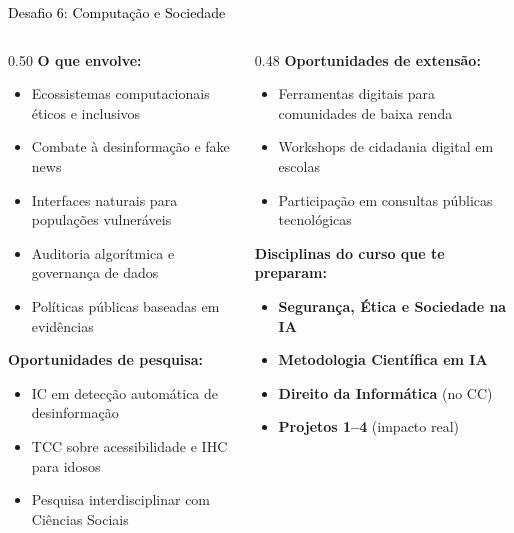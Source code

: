 \documentclass[aspectratio=169]{beamer}
\newcommand{\impt}[1]{\textcolor{morange}{\textbf{#1}}}
\newcommand{\ntc}[1]{\textcolor{mblue}{#1}}
\newcommand{\cc}[1]{\textcolor{mcc}{\textbf{#1}}}
\newcommand{\ia}[1]{\textcolor{mia}{\textbf{#1}}}
\begin{document}
\begin{frame}{\colorbox{dsfsoc}{\textcolor{black}{Desafio 6: Computação e Sociedade}}}
  \footnotesize
  \begin{columns}[T]
    \begin{column}{0.50\textwidth}
      \textbf{O que envolve:}
      \begin{itemize}\setlength\itemsep{3pt}
        \item Ecossistemas computacionais éticos e inclusivos
        \item Combate à desinformação e fake news
        \item Interfaces naturais para populações vulneráveis
        \item Auditoria algorítmica e governança de dados
        \item Políticas públicas baseadas em evidências
      \end{itemize}
      \vspace{0.2cm}
      \textbf{Oportunidades de \impt{pesquisa}:}
      \begin{itemize}\setlength\itemsep{2pt}
        \item IC em detecção automática de desinformação
        \item TCC sobre acessibilidade e IHC para idosos
        \item Pesquisa interdisciplinar com Ciências Sociais
      \end{itemize}
    \end{column}
    \begin{column}{0.48\textwidth}
      \textbf{Oportunidades de \ntc{extensão}:}
      \begin{itemize}\setlength\itemsep{2pt}
        \item Ferramentas digitais para comunidades de baixa renda
        \item Workshops de cidadania digital em escolas
        \item Participação em consultas públicas tecnológicas
      \end{itemize}
      \vspace{0.2cm}
      \textbf{Disciplinas do curso que te preparam:}
      \begin{itemize}\setlength\itemsep{2pt}
        \item \ia{Segurança, Ética e Sociedade na IA}
        \item \ia{Metodologia Científica em IA}
        \item \cc{Direito da Informática} (no CC)
        \item \ia{Projetos 1--4} (impacto real)
      \end{itemize}
    \end{column}
  \end{columns}
\end{frame}
\end{document}
